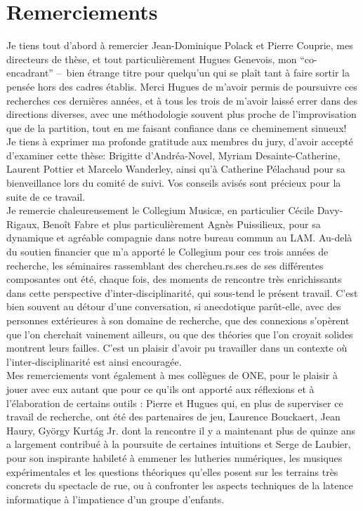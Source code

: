 %
\chapter*{Remerciements}
\label{sec:acknowledgement}
\vspace*{-10mm}


\noindent Je tiens tout d'abord à remercier Jean-Dominique Polack et Pierre Couprie, mes directeurs de thèse, et tout particulièrement Hugues Genevois, mon ``co-encadrant'' --~bien étrange titre pour quelqu'un qui se plaît tant à faire sortir la pensée hors des cadres établis. Merci Hugues de m'avoir permis de poursuivre ces recherches ces dernières années, et à tous les trois de m'avoir laissé errer dans des directions diverses, avec une méthodologie souvent plus proche de l'improvisation que de la partition, tout en me faisant confiance dans ce cheminement sinueux!\\
\indent Je tiens à exprimer ma profonde gratitude aux membres du jury, d'avoir accepté d'examiner cette thèse: Brigitte d'Andréa-Novel, Myriam Desainte-Catherine, Laurent Pottier et Marcelo Wanderley, ainsi qu'à Catherine Pélachaud pour sa bienveillance lors du comité de suivi. Vos conseils avisés sont précieux pour la suite de ce travail.\\
\indent Je remercie chaleureusement le Collegium Musicæ, en particulier Cécile Davy-Rigaux, Benoît Fabre et plus particulièrement Agnès Puissilieux, pour sa dynamique et agréable compagnie dans notre bureau commun au LAM. Au-delà du soutien financier que m'a apporté le Collegium pour ces trois années de recherche, les séminaires rassemblant des chercheu.rs.ses de ses différentes composantes ont été, chaque fois, des moments de rencontre très enrichissants dans cette perspective d'inter-disciplinarité, qui sous-tend le présent travail. C'est bien souvent au détour d'une conversation, si anecdotique parût-elle, avec des personnes extérieures à son domaine de recherche, que des connexions s'opèrent que l'on cherchait vainement ailleurs, ou que des théories que l'on croyait solides montrent leurs failles. C'est un plaisir d'avoir pu travailler dans un contexte où l'inter-disciplinarité est ainsi encouragée.\\
\indent Mes remerciements vont également à mes collègues de ONE, pour le plaisir à jouer avec eux autant que pour ce qu'ils ont apporté aux réflexions et à l'élaboration de certains outils : Pierre et Hugues qui, en plus de superviser ce travail de recherche, ont été des partenaires de jeu, Laurence Bouckaert, Jean Haury, György Kurtág Jr. dont la rencontre il y a maintenant plus de quinze ans a largement contribué à la poursuite de certaines intuitions et Serge de Laubier, pour son inspirante habileté à emmener les lutheries numériques, les musiques expérimentales et les questions théoriques qu'elles posent sur les terrains très concrets du spectacle de rue, ou à confronter les aspects techniques de la latence informatique à l'impatience d'un groupe d'enfants.\\
